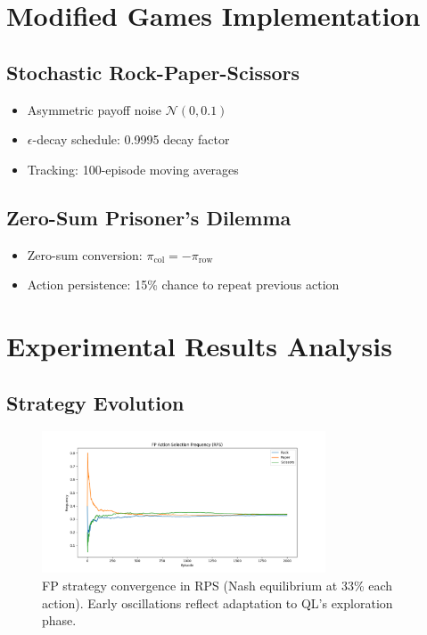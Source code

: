 \documentclass{article}
\begin{document}
\section{Modified Games Implementation}
\subsection{Stochastic Rock-Paper-Scissors}
\begin{itemize}
\item Asymmetric payoff noise $\mathcal{N}(0,0.1)$
\item $\epsilon$-decay schedule: 0.9995 decay factor
\item Tracking: 100-episode moving averages
\end{itemize}

\subsection{Zero-Sum Prisoner's Dilemma}
\begin{itemize}
\item Zero-sum conversion: $\pi_{\text{col}} = -\pi_{\text{row}}$
\item Action persistence: 15\% chance to repeat previous action
\end{itemize}

\section{Experimental Results Analysis}
\subsection{Strategy Evolution}
\begin{figure}[H]
\centering
\includegraphics[width=0.75\textwidth]{rps_fp_strategy.png}
\caption{FP strategy convergence in RPS (Nash equilibrium at 33\% each action). Early oscillations reflect adaptation to QL's exploration phase.}
\label{fig:fp_strat}
\end{figure}
\end{document}
